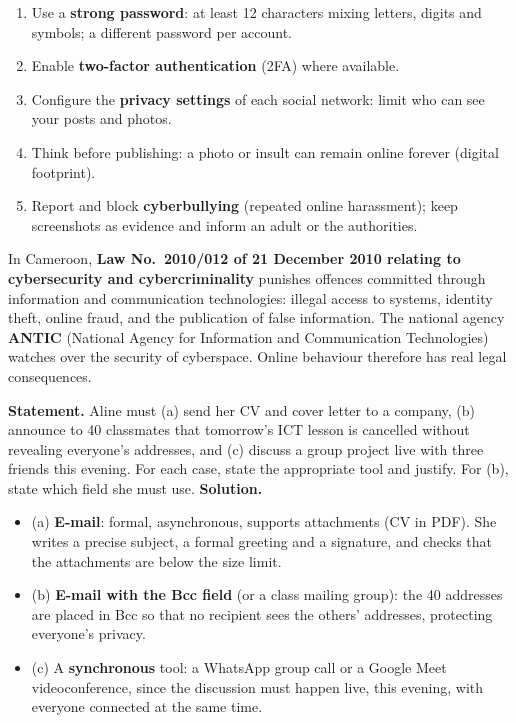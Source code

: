 \documentclass[11pt]{article}
\begin{document}
\begin{methode}
\begin{enumerate}
\item Use a \textbf{strong password}: at least 12 characters mixing letters, digits and symbols; a different password per account.
\item Enable \textbf{two-factor authentication} (2FA) where available.
\item Configure the \textbf{privacy settings} of each social network: limit who can see your posts and photos.
\item Think before publishing: a photo or insult can remain online forever (digital footprint).
\item Report and block \textbf{cyberbullying} (repeated online harassment); keep screenshots as evidence and inform an adult or the authorities.
\end{enumerate}
\end{methode}

\begin{savaistu}
In Cameroon, \textbf{Law No.\ 2010/012 of 21 December 2010 relating to cybersecurity and cybercriminality} punishes offences committed through information and communication technologies: illegal access to systems, identity theft, online fraud, and the publication of false information. The national agency \textbf{ANTIC} (National Agency for Information and Communication Technologies) watches over the security of cyberspace. Online behaviour therefore has real legal consequences.
\end{savaistu}

\begin{exoresolu}
\textbf{Statement.} Aline must (a) send her CV and cover letter to a company, (b) announce to 40 classmates that tomorrow's ICT lesson is cancelled without revealing everyone's addresses, and (c) discuss a group project live with three friends this evening. For each case, state the appropriate tool and justify. For (b), state which field she must use. \tcblower
\textbf{Solution.}
\begin{itemize}
\item (a) \textbf{E-mail}: formal, asynchronous, supports attachments (CV in PDF). She writes a precise subject, a formal greeting and a signature, and checks that the attachments are below the size limit.
\item (b) \textbf{E-mail with the Bcc field} (or a class mailing group): the 40 addresses are placed in Bcc so that no recipient sees the others' addresses, protecting everyone's privacy.
\item (c) A \textbf{synchronous} tool: a WhatsApp group call or a Google Meet videoconference, since the discussion must happen live, this evening, with everyone connected at the same time.
\end{itemize}
\end{exoresolu}
\end{document}
